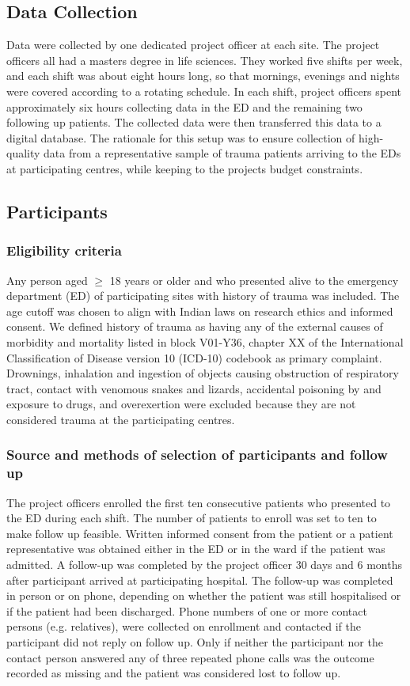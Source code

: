 \documentclass[10pt,letterpaper]{article}\usepackage[]{graphicx}\usepackage[]{color}
\begin{document}
\subsection*{Data Collection}
Data were collected by one dedicated project officer at each site. The project
officers all had a masters degree in life sciences. They worked five shifts per
week, and each shift was about eight hours long, so that mornings, evenings and
nights were covered according to a rotating schedule. In each shift, project
officers spent approximately six hours collecting data in the ED and the
remaining two following up patients. The collected data were then transferred
this data to a digital database. The rationale for this setup was to ensure
collection of high-quality data from a representative sample of trauma patients
arriving to the EDs at participating centres, while keeping to the projects
budget constraints.

\subsection*{Participants}
\subsubsection*{Eligibility criteria}
Any person aged $\geq$ 18 years or older and who presented alive to the
emergency department (ED) of participating sites with history of trauma was
included. The age cutoff was chosen to align with Indian laws on research ethics
and informed consent. We defined history of trauma as having any of the external
causes of morbidity and mortality listed in block V01-Y36, chapter XX of the
International Classification of Disease version 10 (ICD-10) codebook as primary
complaint. Drownings, inhalation and ingestion of objects causing obstruction of
respiratory tract, contact with venomous snakes and lizards, accidental
poisoning by and exposure to drugs, and overexertion were excluded because they
are not considered trauma at the participating centres.

\subsubsection*{Source and methods of selection of participants and follow up}
The project officers enrolled the first ten consecutive patients who presented
to the ED during each shift. The number of patients to enroll was set to ten to
make follow up feasible. Written informed consent from the patient or a patient
representative was obtained either in the ED or in the ward if the patient was
admitted. A follow-up was completed by the project officer 30 days and 6 months
after participant arrived at participating hospital. The follow-up was completed
in person or on phone, depending on whether the patient was still hospitalised
or if the patient had been discharged. Phone numbers of one or more contact
persons (e.g. relatives), were collected on enrollment and contacted if the
participant did not reply on follow up. Only if neither the participant nor the
contact person answered any of three repeated phone calls was the outcome
recorded as missing and the patient was considered lost to follow up.
\end{document}
